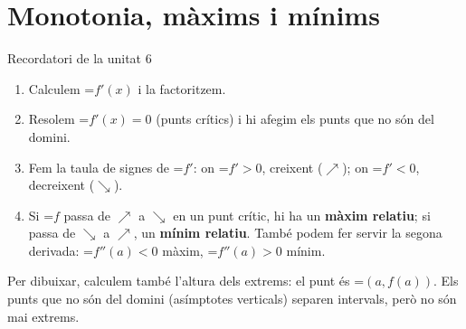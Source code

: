 \documentclass[11pt,a4paper]{article}
\newcommand{\lt}{<}\newcommand{\gt}{>}
\newcommand{\fmm}[1]{\setbox0=\hbox{$#1$}\ifdim\wd0>\linewidth\[#1\]\else\mbox{\box0}\fi}
\begin{document}
  
\section{Monotonia, màxims i mínims}\hypertarget{sec6}{}

  

  
\begin{fmdef}{Recordatori de la unitat 6}
\begin{enumerate}
\item Calculem \fmm{f'(x)} i la factoritzem.
\item Resolem \fmm{f'(x)=0} (punts crítics) i hi afegim els punts que no són del domini.
\item Fem la taula de signes de \fmm{f'}: on \fmm{f'\gt0}, creixent ($\nearrow$); on \fmm{f'\lt0}, decreixent ($\searrow$).
\item Si \fmm{f} passa de $\nearrow$ a $\searrow$ en un punt crític, hi ha un \textbf{màxim relatiu}; si passa de $\searrow$ a $\nearrow$, un \textbf{mínim relatiu}. També podem fer servir la segona derivada: \fmm{f''(a)\lt0} màxim, \fmm{f''(a)\gt0} mínim.
\end{enumerate}

      
\begin{fmnote}Per dibuixar, calculem també l'altura dels extrems: el punt és \fmm{(a,f(a))}. Els punts que no són del domini (asímptotes verticals) separen intervals, però no són mai extrems.\end{fmnote}
\end{fmdef}
\end{document}
